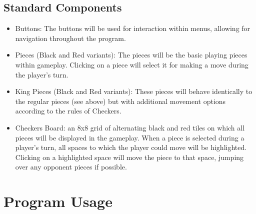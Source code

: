 \documentclass{scrreprt}
\begin{document}
\section{Standard Components}

\begin{itemize}
    \item Buttons: The buttons will be used for interaction within menus, allowing for navigation throughout the program.
    \item Pieces (Black and Red variants): The pieces will be the basic playing pieces within gameplay. Clicking on a piece will select it for making a move during the player’s turn.
    \item King Pieces (Black and Red variants): These pieces will behave identically to the regular pieces (see above) but with additional movement options according to the rules of Checkers.
    \item Checkers Board: an 8x8 grid of alternating black and red tiles on which all pieces will be displayed in the gameplay. When a piece is selected during a player’s turn, all spaces to which the player could move will be highlighted. Clicking on a highlighted space will move the piece to that space, jumping over any opponent pieces if possible.
\end{itemize}

\chapter{Program Usage}
\end{document}
